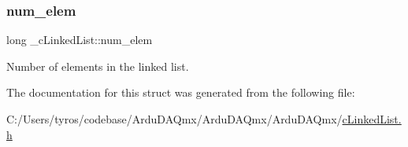 \subsubsection{\texorpdfstring{num\+\_\+elem}{num\_elem}}
{\footnotesize\ttfamily long \+\_\+c\+Linked\+List\+::num\+\_\+elem}

Number of elements in the linked list. 

The documentation for this struct was generated from the following file\+:\begin{DoxyCompactItemize}
\item 
C\+:/\+Users/tyros/codebase/\+Ardu\+D\+A\+Qmx/\+Ardu\+D\+A\+Qmx/\+Ardu\+D\+A\+Qmx/\mbox{\hyperlink{c_linked_list_8h}{c\+Linked\+List.\+h}}\end{DoxyCompactItemize}
